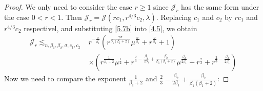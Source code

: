 \documentclass{article}
\numberwithin{equation}{section}
\numberwithin{equation}{section}
\theoremstyle{definition}
\begin{document}
\begin{proof}
	We only need to consider the case $r\ge 1$ since $\mathcal{J}_r$ has the same form under the case $0<r<1$. Then  $\mathcal{J}_r=\mathcal{J}(rc_1,r^{4 /3}c_2,\lambda)$. Replacing $c_1$ and $c_2$ by $rc_1$ and $r^{4 /3}c_2$ respectivel, and substituting \eqref{5.7b} into \eqref{4.5}, we obtain		
	\begin{equation}\label{3.53g}
	\begin{aligned}
		\mathcal{J}_r\lesssim_{n,\beta_1,\beta_2,\sigma,c_1,c_2}&r^{-\frac{\sigma }{\beta_1}}\left( r^{\frac{2\sigma}{\beta_1(\beta_1+2)}}\mu^{\frac{\sigma }{\beta_1}}+r^{\frac{\sigma }{\beta_1}}+1 \right)\\
	&\times \left( r^{\frac{1}{\beta_1+2}}\mu^{\frac{1}{2}}+r^{\frac{2}{3}-\frac{\beta_2}{2\beta_1}+\frac{\beta_2}{\beta_1(\beta_1+2)}}\mu ^{\frac{\beta_2}{2\beta_1}} + r^{\frac{2}{3}}+r^{\frac{2}{3}-\frac{\beta_2}{2\beta_1}}\right)
	\end{aligned}
\end{equation}
Now we need to compare the exponent ${\frac{1}{\beta_1+2}}$ and $\frac{2}{3}-\frac{\beta_2}{2\beta_1}+\frac{\beta_2}{\beta_1(\beta_1+2)}$:


\end{proof}
\end{document}
